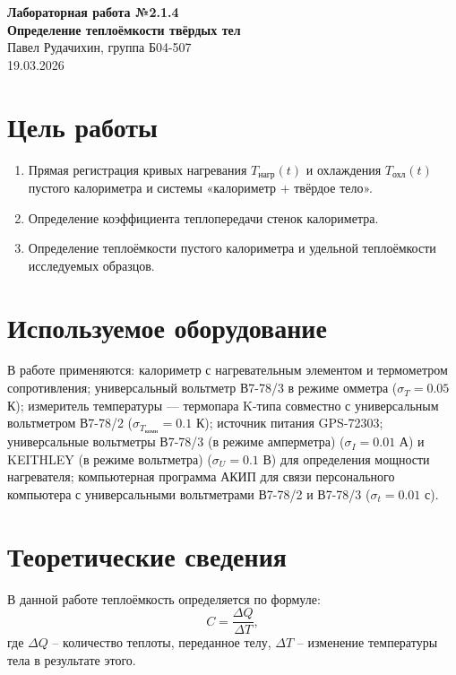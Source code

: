 \documentclass[a4paper,12pt]{article}
\begin{document}
\begin{center}
    {\Large \textbf{Лабораторная работа №2.1.4}} \\
    \vspace{0.3cm}
    {\Large \textbf{Определение теплоёмкости твёрдых тел}} \\
    \vspace{0.5cm}
    Павел Рудачихин, группа Б04-507 \\
    \vspace{0.2cm}
	 19.03.2026
\end{center}

\section*{Цель работы}
\begin{enumerate}
    \item Прямая регистрация кривых нагревания $T_{\text{нагр}}(t)$ и охлаждения $T_{\text{охл}}(t)$ пустого калориметра и системы «калориметр + твёрдое тело».
    \item Определение коэффициента теплопередачи стенок калориметра.
    \item Определение теплоёмкости пустого калориметра и удельной теплоёмкости исследуемых образцов.
\end{enumerate}

\section*{Используемое оборудование}
В работе применяются: калориметр с нагревательным элементом и термометром сопротивления; универсальный вольтметр В7-78/3 в режиме омметра ($\sigma_T = 0.05$ К); измеритель температуры — термопара K-типа совместно с универсальным вольтметром В7-78/2 ($\sigma_{T_{\text{комн}}} = 0.1$ К); источник питания GPS-72303; универсальные вольтметры В7-78/3 (в режиме амперметра) ($\sigma_I = 0.01$ А) и KEITHLEY (в режиме вольтметра) ($\sigma_U = 0.1$ В) для определения мощности нагревателя; компьютерная программа АКИП для связи персонального компьютера с универсальными вольтметрами В7-78/2 и В7-78/3 ($\sigma_t = 0.01$ с).

\section{Теоретические сведения}
В данной работе теплоёмкость определяется по формуле:
\begin{equation}
    C = \frac{\Delta Q}{\Delta T},
    \label{eq:def}
\end{equation}
где $\Delta Q$ – количество теплоты, переданное телу, $\Delta T$ – изменение температуры тела в результате этого.
\end{document}
